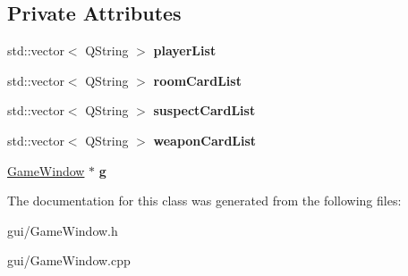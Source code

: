 \subsection*{Private Attributes}
\begin{DoxyCompactItemize}
\item 
\mbox{\label{classGameWindow_a0905541d70cfb7718ae9a5a661482a5e}} 
std\+::vector$<$ Q\+String $>$ {\bfseries player\+List}
\item 
\mbox{\label{classGameWindow_a55e0c93cd8daf7e524a321714c48b86e}} 
std\+::vector$<$ Q\+String $>$ {\bfseries room\+Card\+List}
\item 
\mbox{\label{classGameWindow_a4c9495835fbf46dd648c9c971e3febe3}} 
std\+::vector$<$ Q\+String $>$ {\bfseries suspect\+Card\+List}
\item 
\mbox{\label{classGameWindow_aaf6ca69b449258ca8611daffc67b71bf}} 
std\+::vector$<$ Q\+String $>$ {\bfseries weapon\+Card\+List}
\item 
\mbox{\label{classGameWindow_a2d6e04f799acaa5fcd5450738fcd4bec}} 
\hyperlink{classGameWindow}{Game\+Window} $\ast$ {\bfseries g}
\end{DoxyCompactItemize}


The documentation for this class was generated from the following files\+:\begin{DoxyCompactItemize}
\item 
gui/Game\+Window.\+h\item 
gui/Game\+Window.\+cpp\end{DoxyCompactItemize}
